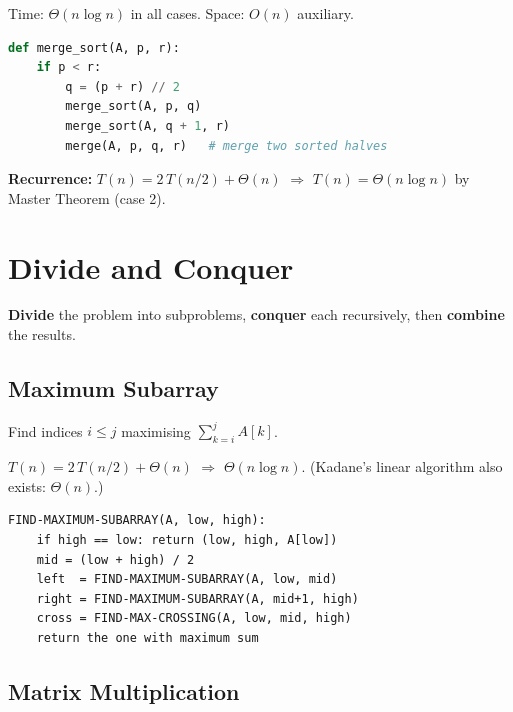 \documentclass[11pt,a4paper,openany]{book}
\begin{document}
\begin{propbox}[title=Complexity]
Time: $\Theta(n \log n)$ in all cases. \quad Space: $O(n)$ auxiliary.
\end{propbox}

\begin{lstlisting}[language=Python]
def merge_sort(A, p, r):
    if p < r:
        q = (p + r) // 2
        merge_sort(A, p, q)
        merge_sort(A, q + 1, r)
        merge(A, p, q, r)   # merge two sorted halves
\end{lstlisting}

\textbf{Recurrence:} $T(n) = 2\,T(n/2) + \Theta(n)$ $\Rightarrow$ $T(n) = \Theta(n \log n)$ by Master Theorem (case 2).

\section{Divide and Conquer}

\begin{defnbox}[title=Paradigm]
\textbf{Divide} the problem into subproblems, \textbf{conquer} each recursively, then
\textbf{combine} the results.
\end{defnbox}

\subsection{Maximum Subarray}

Find indices $i \leq j$ maximising $\sum_{k=i}^{j} A[k]$.

\begin{propbox}[title=Complexity]
$T(n) = 2\,T(n/2) + \Theta(n)$ $\Rightarrow$ $\Theta(n \log n)$.
(Kadane's linear algorithm also exists: $\Theta(n)$.)
\end{propbox}

\begin{lstlisting}
FIND-MAXIMUM-SUBARRAY(A, low, high):
    if high == low: return (low, high, A[low])
    mid = (low + high) / 2
    left  = FIND-MAXIMUM-SUBARRAY(A, low, mid)
    right = FIND-MAXIMUM-SUBARRAY(A, mid+1, high)
    cross = FIND-MAX-CROSSING(A, low, mid, high)
    return the one with maximum sum
\end{lstlisting}

\subsection{Matrix Multiplication}
\end{document}
